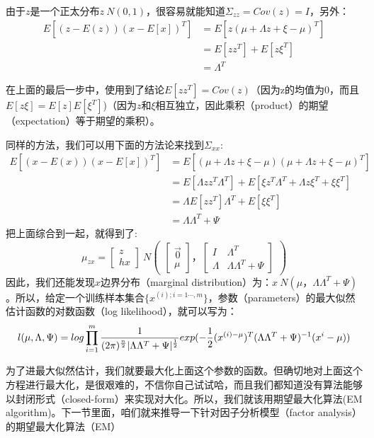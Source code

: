 \documentclass[14pt,a4paper]{article}
\begin{document}
\begin{spacing}{1.5}
由于$z$是一个正太分布$z~N(0,1)$，很容易就能知道$\Sigma_{zz}=Cov(z)=I$，另外：
$$
\begin{aligned}
E[(z-E(z))(x-E[x])^{T}]&=E[z(\mu+\Lambda z+\xi-\mu)^{T}]\\
&=E[zz^{T}]+E[z\xi^{T}]\\
&=\Lambda^{T}
\end{aligned}
$$

在上面的最后一步中，使用到了结论$E[zz^{T}]=Cov(z)$（因为z的均值为0，而且$E[z\xi]=E[z]E[\xi^{T}]$)（因为$z$和$\xi$相互独立，因此乘积（product）的期望（expectation）等于期望的乘积）。

同样的方法，我们可以用下面的方法论来找到$\Sigma_{xx}$:
$$
\begin{aligned}
E[(x-E(x))(x-E[x])^{T}]&=E[(\mu+\Lambda z+\xi-\mu)(\mu+\Lambda z+\xi-\mu)^{T}]\\
&=E[\Lambda zz^{T}\Lambda^{T}]+E[\xi z^{T}\Lambda^{T}+\Lambda z\xi^{T}+\xi\xi^{T}]\\
&=\Lambda E[zz^{T}]\Lambda^{T}+E[\xi\xi^{T}]\\
&=\Lambda\Lambda^{T}+\Psi
\end{aligned}
$$
把上面综合到一起，就得到了:
$$
\mu_{zx}=\begin{bmatrix}
z \\ hx
\end{bmatrix}
~N\begin{pmatrix}
\begin{bmatrix}\vec{0}\\ \mu\end{bmatrix}，
\begin{bmatrix}I&\Lambda^{T}\\ \Lambda &\Lambda\Lambda^{T}+\Psi\end{bmatrix}
\end{pmatrix}
$$
因此，我们还能发现$x$边界分布（marginal distribution）为：$x~N(\mu，\Lambda\Lambda^{T}+\Psi)$。所以，给定一个训练样本集合$\{x^{(i);i=1\cdots,m}\}$，参数（parameters）的最大似然估计函数的对数函数（log likelihood），就可以写为：
$$
l(\mu,\Lambda,\Psi)=log\prod_{i=1}^{m}\frac{1}{(2\pi)^{n\over 2}|\Lambda\Lambda^{T}+\Psi|^{\frac{1}{2}}}exp(-\frac{1}{2}(x^{(i)-\mu})^{T}(\Lambda\Lambda^{T}+\Psi)^{-1}(x^{i}-\mu))
$$

为了进最大似然估计，我们就要最大化上面这个参数的函数。但确切地对上面这个方程进行最大化，是很艰难的，不信你自己试试哈，而且我们都知道没有算法能够以封闭形式（closed-form）来实现对大化。所以，我们就该用期望最大化算法(EM algorithm)。下一节里面，咱们就来推导一下针对因子分析模型（factor analysis）的期望最大化算法（EM）

\end{spacing}
\end{document}

